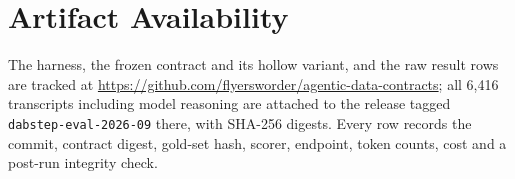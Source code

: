 \section*{Artifact Availability}

The harness, the frozen contract and its hollow variant, and the raw result
rows are tracked at
\url{https://github.com/flyersworder/agentic-data-contracts}; all 6{,}416
transcripts including model reasoning are attached to the release tagged
\texttt{dabstep-eval-2026-09} there, with SHA-256 digests. Every row records the commit, contract
digest, gold-set hash, scorer, endpoint, token counts, cost and a post-run
integrity check.

